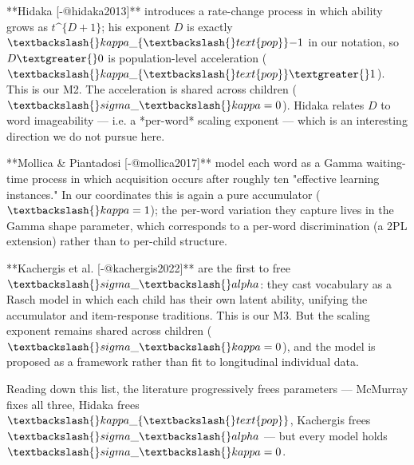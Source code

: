 \documentclass[
  11pt,
]{article}
\newenvironment{Shaded}{\begin{snugshade}}{\end{snugshade}}
\newcommand{\NormalTok}[1]{\textcolor[rgb]{0.00,0.23,0.31}{#1}}
\begin{document}
\begin{Shaded}
\begin{Highlighting}[]
\NormalTok{**Hidaka [{-}@hidaka2013]** introduces a rate{-}change process in which ability}
\NormalTok{grows as $t\^{}\{D+1\}$; his exponent $D$ is exactly $\textbackslash{}kappa\_\{\textbackslash{}text\{pop\}\} {-} 1$}
\NormalTok{in our notation, so $D \textgreater{} 0$ is population{-}level acceleration}
\NormalTok{($\textbackslash{}kappa\_\{\textbackslash{}text\{pop\}\} \textgreater{} 1$). This is our M2. The acceleration is shared}
\NormalTok{across children ($\textbackslash{}sigma\_\textbackslash{}kappa = 0$). Hidaka relates $D$ to word}
\NormalTok{imageability — i.e. a *per{-}word* scaling exponent — which is an}
\NormalTok{interesting direction we do not pursue here.}

\NormalTok{**Mollica \& Piantadosi [{-}@mollica2017]** model each word as a Gamma}
\NormalTok{waiting{-}time process in which acquisition occurs after roughly ten}
\NormalTok{"effective learning instances." In our coordinates this is again a pure}
\NormalTok{accumulator ($\textbackslash{}kappa = 1$); the per{-}word variation they capture lives in}
\NormalTok{the Gamma shape parameter, which corresponds to a per{-}word discrimination}
\NormalTok{(a 2PL extension) rather than to per{-}child structure.}

\NormalTok{**Kachergis et al. [{-}@kachergis2022]** are the first to free}
\NormalTok{$\textbackslash{}sigma\_\textbackslash{}alpha$: they cast vocabulary as a Rasch model in which each child}
\NormalTok{has their own latent ability, unifying the accumulator and item{-}response}
\NormalTok{traditions. This is our M3. But the scaling exponent remains shared across}
\NormalTok{children ($\textbackslash{}sigma\_\textbackslash{}kappa = 0$), and the model is proposed as a framework}
\NormalTok{rather than fit to longitudinal individual data.}

\NormalTok{Reading down this list, the literature progressively frees parameters —}
\NormalTok{McMurray fixes all three, Hidaka frees $\textbackslash{}kappa\_\{\textbackslash{}text\{pop\}\}$, Kachergis}
\NormalTok{frees $\textbackslash{}sigma\_\textbackslash{}alpha$ — but every model holds $\textbackslash{}sigma\_\textbackslash{}kappa = 0$.}


\end{Highlighting}
\end{Shaded}
\end{document}
